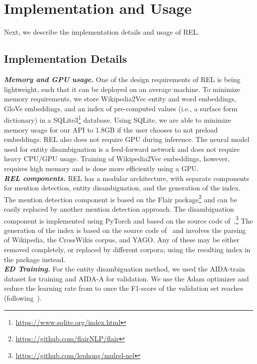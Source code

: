 \documentclass[sigconf]{acmart}
\begin{document}
 \section{Implementation and Usage}
\label{sec:Imp}
\vspace*{-0.25\baselineskip}
Next, we describe the implementation details and usage of REL.

\vspace*{-0.25\baselineskip}
\subsection{Implementation Details}

\noindent
\emph{\textbf{Memory and GPU usage.}} One of the design requirements of REL is being lightweight, such that it can be deployed on an average machine. To minimize memory requirements, we store Wikipedia2Vec entity and word embeddings, GloVe embeddings, and an index of pre-computed  values (i.e., a surface form dictionary) in a SQLite3\footnote{\url{https://www.sqlite.org/index.html}} database. Using SQLite, we are able to minimize memory usage for our API to 1.8GB if the user chooses to not preload embeddings. REL also does not require GPU during inference. The neural model used for entity disambiguation is a feed-forward network and does not require heavy CPU/GPU usage. Training of Wikipedia2Vec embeddings, however, requires high memory and is done more efficiently using a GPU.
\\



\noindent
\emph{\textbf{REL components.}} REL has a modular architecture, with separate components for mention detection, entity disambiguation, and the generation of the  index. The mention detection component is based on the Flair package\footnote{\url{https://github.com/flairNLP/flair}} and can be easily replaced by another mention detection approach. The disambiguation component is implemented using PyTorch and based on the source code of~\citep{Le:2018:IEL}.\footnote{\url{https://github.com/lephong/mulrel-nel}} The generation of the  index is based on the source code of~\cite{Ganea:2017:DJE} and involves the parsing of Wikipedia, the CrossWikis corpus, and YAGO. Any of these may be either removed completely, or replaced by different corpora; using the resulting  index in the package instead. \\

\noindent
\emph{\textbf{ED Training.}} For the entity disambiguation method, we used the AIDA-train dataset for training and AIDA-A for validation. We use the Adam optimizer and reduce the learning rate from  to  once the F1-score of the validation set reaches  (following~\cite{Le:2018:IEL}).
\\
\end{document}
